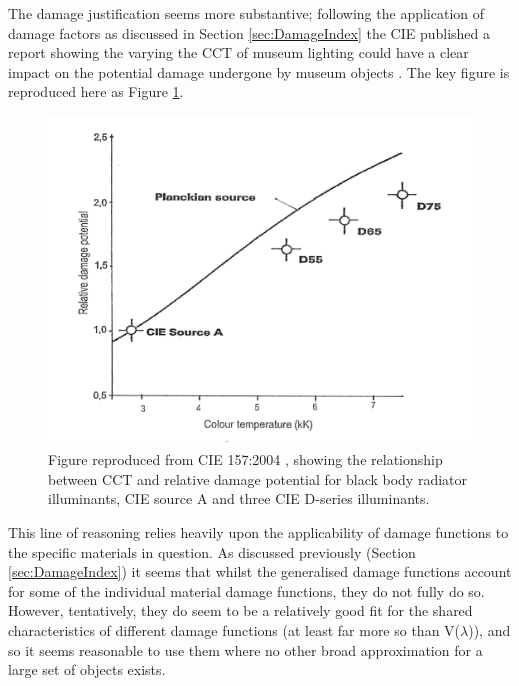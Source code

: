The damage justification seems more substantive; following the application of damage factors as discussed in Section \ref{sec:DamageIndex} the \gls{CIE} published a report showing the varying the \gls{CCT} of museum lighting could have a clear impact on the potential damage undergone by museum objects \citep{cie_cie_2004}. The key figure is reproduced here as Figure \ref{fig:CIE2004}.

\begin{figure}[hbtp]
\includegraphics[max width=\textwidth]{figs/LitRev/CIE2004.png} 
\caption{Figure reproduced from \gls{CIE} 157:2004 \citep[p.16]{cie_cie_2004}, showing the relationship between \gls{CCT} and relative damage potential for black body radiator illuminants, \gls{CIE} source A and three \gls{CIE} D-series illuminants.}
\label{fig:CIE2004}
\end{figure}

This line of reasoning relies heavily upon the applicability of damage functions to the specific materials in question. As discussed previously (Section \ref{sec:DamageIndex}) it seems that whilst the generalised damage functions account for some of the individual material damage functions, they do not fully do so. However, tentatively, they do seem to be a relatively good fit for the shared characteristics of different damage functions (at least far more so than V($\lambda$)), and so it seems reasonable to use them where no other broad approximation for a large set of objects exists.

